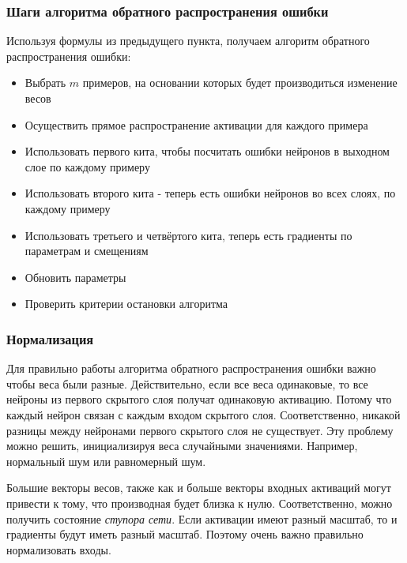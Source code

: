 \subsubsection{Шаги алгоритма обратного распространения ошибки}

Используя формулы из предыдущего пункта, получаем алгоритм обратного распространения ошибки:

\begin{itemize}
  \item Выбрать $m$ примеров, на основании которых будет производиться изменение весов
  \item Осуществить прямое распространение активации для каждого примера
  \item Использовать первого кита, чтобы посчитать ошибки нейронов в выходном слое по каждому примеру
  \item Использовать второго кита - теперь есть ошибки нейронов во всех слоях, по каждому примеру
  \item Использовать третьего и четвёртого кита, теперь есть градиенты по параметрам и смещениям
  \item Обновить параметры
  \item Проверить критерии остановки алгоритма
\end{itemize}

\subsubsection{Нормализация}

Для правильно работы алгоритма обратного распространения ошибки важно чтобы веса были разные. Действительно, если все веса одинаковые, то все нейроны из первого скрытого слоя получат одинаковую активацию. Потому что каждый нейрон связан с каждым входом скрытого слоя. Соответственно, никакой разницы между нейронами первого скрытого слоя не существует. 
Эту проблему можно решить, инициализируя веса случайными значениями. Например, нормальный шум или равномерный шум.

Большие векторы весов, также как и больше векторы входных активаций могут привести к тому, что производная будет близка к нулю. Соответственно, можно получить состояние \textit{ступора сети}. Если активации имеют разный масштаб, то и градиенты будут иметь разный масштаб. Поэтому очень важно правильно нормализовать входы.